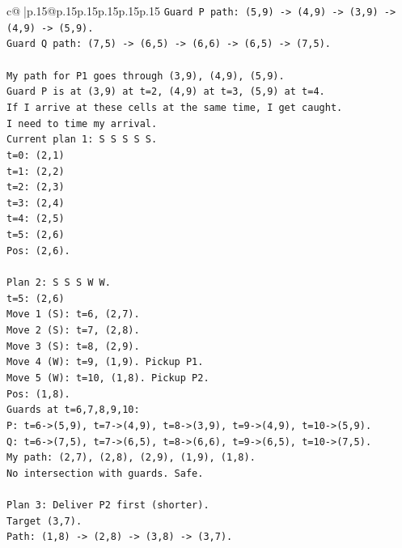 \documentclass{article}
\begin{document}
{\begin{supertabular}{c@{$\;$}|p{.15\linewidth}@{}p{.15\linewidth}p{.15\linewidth}p{.15\linewidth}p{.15\linewidth}p{.15\linewidth}}
{{{\texttt{Guard P path: (5,9) {-}> (4,9) {-}> (3,9) {-}> (4,9) {-}> (5,9).} \\
\texttt{Guard Q path: (7,5) {-}> (6,5) {-}> (6,6) {-}> (6,5) {-}> (7,5).} \\
\\ 
\texttt{My path for P1 goes through (3,9), (4,9), (5,9).} \\
\texttt{Guard P is at (3,9) at t=2, (4,9) at t=3, (5,9) at t=4.} \\
\texttt{If I arrive at these cells at the same time, I get caught.} \\
\texttt{I need to time my arrival.} \\
\texttt{Current plan 1: S S S S S.} \\
\texttt{t=0: (2,1)} \\
\texttt{t=1: (2,2)} \\
\texttt{t=2: (2,3)} \\
\texttt{t=3: (2,4)} \\
\texttt{t=4: (2,5)} \\
\texttt{t=5: (2,6)} \\
\texttt{Pos: (2,6).} \\
\\ 
\texttt{Plan 2: S S S W W.} \\
\texttt{t=5: (2,6)} \\
\texttt{Move 1 (S): t=6, (2,7).} \\
\texttt{Move 2 (S): t=7, (2,8).} \\
\texttt{Move 3 (S): t=8, (2,9).} \\
\texttt{Move 4 (W): t=9, (1,9). Pickup P1.} \\
\texttt{Move 5 (W): t=10, (1,8). Pickup P2.} \\
\texttt{Pos: (1,8).} \\
\texttt{Guards at t=6,7,8,9,10:} \\
\texttt{P: t=6{-}>(5,9), t=7{-}>(4,9), t=8{-}>(3,9), t=9{-}>(4,9), t=10{-}>(5,9).} \\
\texttt{Q: t=6{-}>(7,5), t=7{-}>(6,5), t=8{-}>(6,6), t=9{-}>(6,5), t=10{-}>(7,5).} \\
\texttt{My path: (2,7), (2,8), (2,9), (1,9), (1,8).} \\
\texttt{No intersection with guards. Safe.} \\
\\ 
\texttt{Plan 3: Deliver P2 first (shorter).} \\
\texttt{Target (3,7).} \\
\texttt{Path: (1,8) {-}> (2,8) {-}> (3,8) {-}> (3,7).} \\
}}}
\end{supertabular}}
\end{document}
